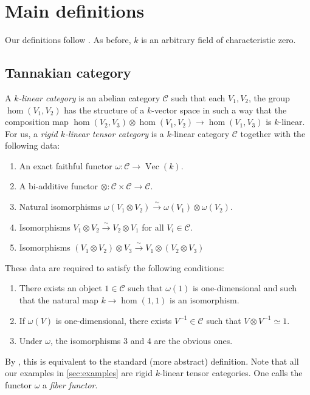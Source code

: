 \documentclass{article}
\DeclareMathOperator{\vect}{Vec}
\newcommand{\cC}{\mathcal{C}}
\newcommand{\iso}{\xrightarrow\sim}
\begin{document}
\section{Main definitions}

Our definitions follow \cite{deligne-milne-1982}. As before, $k$ is an 
arbitrary field of characteristic zero. 


\subsection{Tannakian category}

A \emph{$k$-linear category} is an abelian category $\cC$ such that each 
$V_1,V_2$, the group $\hom(V_1,V_2)$ has the structure of a $k$-vector space 
in such a way that the composition map 
$\hom(V_2,V_3)\otimes \hom(V_1,V_2)\to \hom(V_1,V_3)$ is $k$-linear. For us, 
a \emph{rigid $k$-linear tensor category} is a $k$-linear category $\cC$ 
together with the following data:
\begin{enumerate}
\item An exact faithful functor $\omega:\cC\to \vect(k)$. 
\item A bi-additive functor $\otimes:\cC\times \cC\to \cC$. 
\item Natural isomorphisms 
$\omega(V_1\otimes V_2)\iso \omega(V_1)\otimes \omega(V_2)$. 
\item Isomorphisms $V_1\otimes V_2\iso V_2\otimes V_1$ for all $V_i\in \cC$. 
\item Isomorphisms $(V_1\otimes V_2)\otimes V_3\iso V_1\otimes (V_2\otimes V_3)$
\end{enumerate}
These data are required to satisfy the following conditions:
\begin{enumerate}
\item There exists an object $1\in \cC$ such that $\omega(1)$ is 
one-dimensional and such that the natural map $k\to \hom(1,1)$ is an 
isomorphism. 
\item If $\omega(V)$ is one-dimensional, there exists $V^{-1}\in \cC$ such 
that $V\otimes V^{-1}\simeq 1$. 
\item Under $\omega$, the isomorphisms 3 and 4 are the obvious ones. 
\end{enumerate}

By \cite[Pr.~1.20]{deligne-milne-1982}, this is equivalent to the standard 
(more abstract) definition. Note that all our examples in 
\autoref{sec:examples} are rigid $k$-linear tensor categories. One calls the 
functor $\omega$ a \emph{fiber functor}. 
\end{document}
